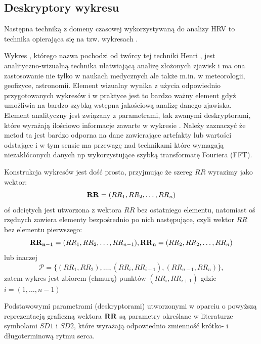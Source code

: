 \subsection{Deskryptory wykresu \PP{}}


Następna techniką z domeny czasowej wykorzystywaną do analizy HRV to technika opierająca
się na tzw. wykresach \PP{}.

Wykres \PP{}, którego nazwa pochodzi od twórcy tej techniki Henri \PP{}, jest\\ 
analityczno-wizualną technika ułatwiającą analizę złożonych zjawisk i ma ona zastosowanie
nie tylko w naukach medycznych ale także m.in. w meteorologii, geofizyce, astronomii.
Element wizualny wynika z użycia odpowiednio przygotowanych wykresów i w praktyce jest to
bardzo ważny element gdyż umożliwia na bardzo szybką wstępna jakościową analizę danego
zjawiska. Element analityczny jest związany z parametrami, tak zwanymi deskryptorami,
które wyrażają ilościowo informacje zawarte w wykresie \PP{}. Należy zaznaczyć że
metod ta jest bardzo odporna na dane zawierające artefakty lub wartości odstające i w
tym sensie ma przewagę nad technikami które wymagają niezakłóconych danych np 
wykorzystujące szybką transformatę Fouriera (FFT).

Konstrukcja wykresów \PP{} jest dość prosta, przyjmując że szereg $RR$ wyrazimy jako
wektor:
\begin{equation}
\mathbf{RR} = (RR_{1}, RR_{2}, \ldots, RR_{n})
\end{equation}
oś odciętych jest utworzona z wektora $RR$ bez ostatniego elementu, natomiast oś rzędnych
zawiera elementy bezpośrednio po nich następujące, czyli wektor $RR$ bez elementu
pierwszego:
\begin{equation}
\mathbf{RR_{n-1}} = (RR_{1}, RR_{2}, \ldots, RR_{n-1}),
\mathbf{RR_n} = (RR_{2}, RR_{2}, \ldots, RR_{n}) 
\end{equation}
lub inaczej
\begin{equation}
  \mathcal{P} = \{(RR_1, RR_2),\ldots, (RR_i, RR_{i+1}), (RR_{n-1}, RR_n )\},
 \label{eq:p_plot}
\end{equation}
zatem wykres \PP{} jest zbiorem (chmurą) punktów $(RR_{i}, RR_{i+1})$ gdzie $i=(1, \ldots, n-1)$

Podstawowymi parametrami (deskryptorami) utworzonymi w oparciu o powyższą reprezentacją 
graficzną wektora $\mathbf{RR}$ są parametry określane w literaturze symbolami $SD1$ i $SD2$, które
wyrażają odpowiednio zmienność krótko- i długoterminową rytmu serca.

